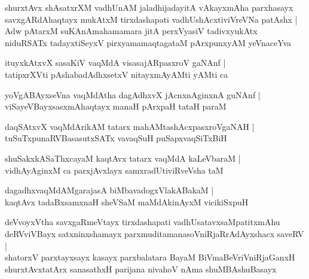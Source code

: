 \documentclass[twoside,12pt,openright]{book}
\newcounter{shloka}[chapter]
\begin{document}
\begin{shloka}%
shurxtAvx shAsatxrXM vadhUnAM jaladhijadayitA vAkayxmAha parxhasayx \\
savxgARdAhaqtayx mukAtxM tirxdashapati vadhUshAcxtiviVreVNa patAshx |\\
Adw pAtarxM suKAnAmahamamara jitA perxVyasiV tadivxyukAtx \\
niduRSATx tadayxtiSeyxV pirxyamamaqtagataM pArxpunxyAM yeVnaceYva
\end{shloka}

\begin{shloka}%
ituyxkAtxvX sasaKiV vaqMdA visasajARpasxroV gaNAnf |\\
tatipxrXVti pAshabadAdhxsetxV nitayxmAyAMti yAMti ca 
\end{shloka}

\begin{shloka}%
yoVgABAyxseVna vaqMdAtha dagAdhxvX jAcnxnAginxnA guNAnf |\\
viSayeVBayxsasxmAhaqtayx manaH pArxpaH tataH paraM 
\end{shloka}

\begin{shloka}%
daqSAtxvX vaqMdArikAM tatarx mahAMtashAcxpasxroVgaNAH |\\
tuSuTxpunaRVBasasutxSATx vavaqSuH puSapxvaqSiTxBiH
\end{shloka}

\begin{shloka}%
shuSakxkASaThxcayaM kaqtAvx tatarx vaqMdA kaLeVbaraM |\\
vidhAyAginxM ca parxjAvxlayx samxradUtiviRveVsha taM 
\end{shloka}

\begin{shloka}%
dagadhxvaqMdAMgarajasA biMbavadogxVlakABakaM |\\
kaqtAvx tadaBxsamxnaH sheVSaM maMdAkinAyxM vicikiSxpuH
\end{shloka}

\begin{shloka}%
deVvoyxVtha savxgaRmeVtayx tirxdashapati vadhUsatavxsaMpatitxmAhu \\
deRVviVBayx satxninxshamayx parxmuditamanasoVniRjaRrAdAyxshacx saveRV |\\
shatorxV parxtayxsayx kasayx parxbalatara BayaM BiVmaBeVriVniRjaGanxH \\
shurxtAvxtatArx sanasathxH parijana nivahoV nAma shuMBAshuBasayx 
\end{shloka}
\end{document}
